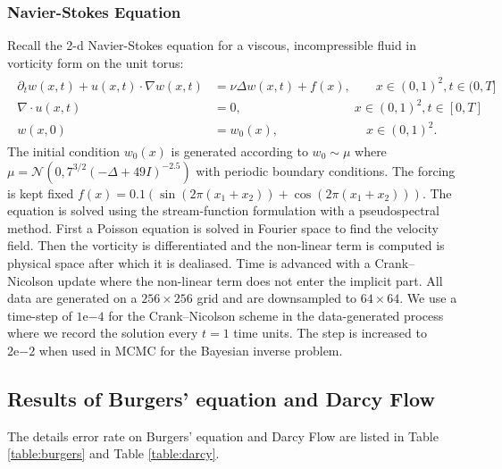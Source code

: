 \documentclass{article} %
\begin{document}
\subsubsection{Navier-Stokes Equation}
\label{app:ns}
Recall the 2-d Navier-Stokes equation for a viscous, incompressible fluid in vorticity form on the unit torus:
\begin{align*}
\begin{split}
\partial_t w(x,t) + u(x,t) \cdot \nabla w(x,t) &= \nu \Delta w(x,t) + f(x), \qquad x \in (0,1)^2, t \in (0,T]  \\
\nabla \cdot u(x,t) &= 0, \qquad \qquad \qquad \qquad \quad x \in (0,1)^2, t \in [0,T]  \\
w(x,0) &= w_0(x), \qquad \qquad \qquad \quad x \in (0,1)^2.
\end{split}
\end{align*}
The initial condition $ w_0(x)$ is generated according to 
\(w_0 \sim \mu\) where \(\mu = \mathcal{N}(0,7^{3/2}(-\Delta + 49I)^{-2.5})\) with periodic boundary conditions. The forcing is kept fixed $f(x) = 0.1(\sin(2\pi(x_1+x_2)) + \cos(2\pi(x_1 + x_2)))$. The equation is solved using the stream-function formulation with a pseudospectral method. First a Poisson equation is solved in Fourier space to find the velocity field. Then the vorticity is differentiated and the non-linear term is computed is physical space after which it is dealiased. Time is advanced with a Crank–Nicolson update where the non-linear term does not enter the implicit part. 
All data are generated on a $256 \times 256$ grid and are downsampled to $64 \times 64$. We use a time-step of $1\mathrm{e}{-4}$ for the Crank–Nicolson scheme in the data-generated process where we record the solution every $t=1$ time units. The step is increased to $2\mathrm{e}{-2}$ when used in MCMC for the Bayesian inverse problem.

\subsection{Results of Burgers' equation and Darcy Flow}
The details error rate on Burgers' equation and Darcy Flow are listed in Table \ref{table:burgers} and Table \ref{table:darcy}.
\end{document}

